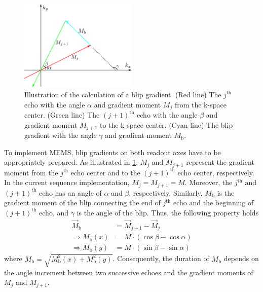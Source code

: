 \begin{figure}[tb]
  \centering
  \includegraphics[width=0.50\textwidth]{fig/multi-echo-multi-spoke-blip.png}
  \caption{Illustration of the calculation of a blip gradient. (Red line) The $j^{\text{th}}$ echo with the angle $\alpha$ and gradient moment $M_{j}$ from the k-space center. (Green line) The $(j+1)^{\text{th}}$ echo with the angle $\beta$ and gradient moment $M_{j+1}$ to the k-space center. (Cyan line) The blip gradient with the angle $\gamma$ and gradient moment $M_{\text{b}}$.} \label{Fig:multi-echo-multi-spoke-blip}
\end{figure}
To implement MEMS, blip gradients on both readout axes have to be appropriately prepared. As illustrated in \cref{Fig:multi-echo-multi-spoke-blip}, $M_{j}$ and $M_{j+1}$ represent the gradient moment from the $j^{\text{th}}$ echo center and to the $(j+1)^{\text{th}}$ echo center, respectively. In the current sequence implementation, $M_{j} = M_{j+1} = M$. Moreover, the $j^{\text{th}}$ and $(j+1)^{\text{th}}$ echo has an angle of $\alpha$ and $\beta$, respectively. Similarly, $M_{\text{b}}$ is the gradient moment of the blip connecting the end of $j^{\text{th}}$ echo and the beginning of $(j+1)^{\text{th}}$ echo, and $\gamma$ is the angle of the blip. Thus, the following property holds
\begin{align}
  \vec{M}_{\text{b}}           &= \vec{M}_{j+1} - \vec{M}_{j} \\
  \Rightarrow M_{\text{b}} (x) &= M \cdot ( \cos \beta - \cos \alpha ) \\
  \Rightarrow M_{\text{b}} (y) &= M \cdot ( \sin \beta - \sin \alpha ) 
\end{align}
where $M_{\text{b}} = \sqrt{ M^2_{\text{b}} (x) + M^2_{\text{b}} (y) }$. Consequently, the duration of $M_{\text{b}}$ depends on the angle increment between two successive echoes and the gradient moments of $M_{j}$ and $M_{j+1}$. 


